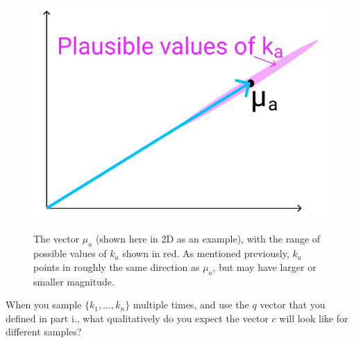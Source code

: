 \documentclass[letterpaper,12pt]{article}
\begin{document}
\begin{itemize}
		\begin{figure}[htbp] 
			\centering 
			\includegraphics[width=0.5\linewidth]{picture/ka_plausible}
			\captionsetup{font=small}
			\label{vector}
			\caption{
				\label{fig: vector} %
				The vector $\mu_a$ (shown here in 2D as an example), with the range of possible values of $k_a$ shown in red. As mentioned previously, $k_a$ points in roughly the same direction as $\mu_a$, but may have larger or smaller magnitude.
			}
		\end{figure}
		
		When you sample $\{k_1, \ldots , k_n\}$ multiple times, and use the $q$ vector that you defined in part i., what qualitatively do you expect the vector $c$ will look like for different samples?
		

\end{itemize}
\end{document}

